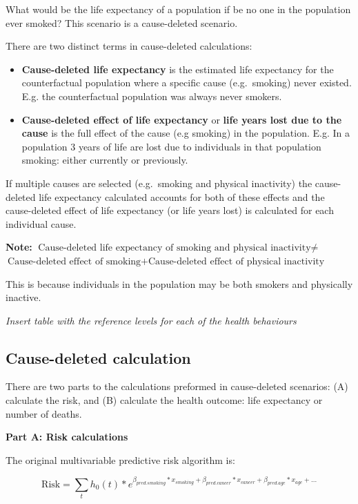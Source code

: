 \documentclass[]{book}
\begin{document}
What would be the life expectancy of a population if be no one in the
population ever smoked? This scenario is a cause-deleted scenario.

There are two distinct terms in cause-deleted calculations:

\begin{itemize}
\item
  \textbf{Cause-deleted life expectancy} is the estimated life
  expectancy for the counterfactual population where a specific cause
  (e.g.~smoking) never existed. E.g. the counterfactual population was
  always never smokers.
\item
  \textbf{Cause-deleted effect of life expectancy} or \textbf{life years
  lost due to the cause} is the full effect of the cause (e.g smoking)
  in the population. E.g. In a population 3 years of life are lost due
  to individuals in that population smoking: either currently or
  previously.
\end{itemize}

If multiple causes are selected (e.g.~smoking and physical inactivity)
the cause-deleted life expectancy calculated accounts for both of these
effects and the cause-deleted effect of life expectancy (or life years
lost) is calculated for each individual cause.

\textbf{Note:}
\(\text{Cause-deleted life expectancy of smoking and physical inactivity} \neq\)
\(\text{Cause-deleted effect of smoking} + \text{Cause-deleted effect of physical inactivity}\)

This is because individuals in the population may be both smokers and
physically inactive.

\emph{Insert table with the reference levels for each of the health
behaviours}

\subsection{Cause-deleted calculation}\label{cause-deleted-calculation}

There are two parts to the calculations preformed in cause-deleted
scenarios: (A) calculate the risk, and (B) calculate the health outcome:
life expectancy or number of deaths.

\textbf{Part A: Risk calculations}

The original multivariable predictive risk algorithm is:

\[ \text{Risk} = \sum_t h_0(t) * e^{\beta_{pred.smoking}*x_{smoking}+\beta_{pred.cancer}*x_{cancer} + \beta_{pred.age}*x_{age} +...}  \]
\end{document}
